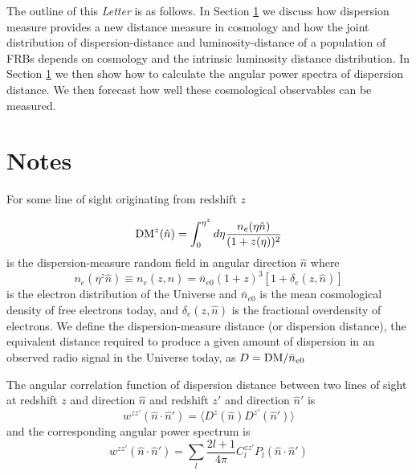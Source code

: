 \documentclass[twocolumn,prd,noshowpacs,nofootinbib,amsmath,amssymb]{revtex4}
\begin{document}
 The outline of this \emph{Letter} is as follows. In Section \ref{sec:notes} we discuss how dispersion measure provides a new distance measure in cosmology and how the joint distribution of dispersion-distance and luminosity-distance of a population of FRBs depends on cosmology and the intrinsic luminosity distance distribution.   In Section \ref{sec:notes} we then show how to calculate the angular power spectra of dispersion distance.  We then forecast how well these cosmological observables can be measured.

%
%

\section{Notes}\label{sec:notes}



For some line of sight originating from redshift $z$

\begin{equation}
{\rm DM}^{z}(\hat{n}) = \int_0^{\eta^z} d\eta \frac{n_e(\eta\hat{n})}{(1+z(\eta))^2}
\end{equation}
is the dispersion-measure random field in angular direction $\hat{n}$ where
\begin{equation}
n_e(\eta^z\hat{n}) \equiv n_e(z,\hat{n}) =  \bar{n}_{e0} (1+z)^3 \left[1+\delta_e(z,\hat{n})\right]
\end{equation}
is the electron distribution of the Universe and $\bar{n}_{e0}$ is the mean cosmological density of free electrons today, and $\delta_e(z,\hat{n})$ is 
the fractional overdensity of electrons.
We define the dispersion-measure distance (or dispersion distance), the equivalent distance required to
produce a given amount of dispersion in an observed radio signal in the Universe today, as 
$ D = {{\rm DM}}/{\bar{n}_{e0}}$

The angular correlation function of dispersion distance between two lines of sight at redshift $z$ and direction $\hat{n}$ and redshift $z'$ and direction $\hat{n}'$ is
\begin{equation}
w^{z z'}(\hat{n}\cdot\hat{n}') = \langle D^z(\hat{n}) D^{z'}(\hat{n}') \rangle
\end{equation}
and the corresponding angular power spectrum is
\begin{equation}
w^{z z'}(\hat{n}\cdot\hat{n}') = \sum_l \frac{2l+1}{4 \pi} C_l^{z z'} P_l(\hat{n}\cdot\hat{n}')
\end{equation}
\end{document}
